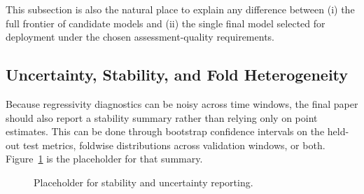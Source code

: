 \documentclass[12pt]{article}
\theoremstyle{plain}
\theoremstyle{definition}
\begin{document}
\begin{table}[t]
\centering
\caption{Placeholder for the exact empirical calibration rule used on validation folds.}
\label{tab:calibration_constraints_placeholder}
\end{table}

\begin{table}[t]
\centering
\caption{Placeholder for the final selected configuration under constrained calibration.}
\label{tab:selected_model_placeholder}
\end{table}

This subsection is also the natural place to explain any difference between (i) the full frontier of candidate models and (ii) the single final model selected for deployment under the chosen assessment-quality requirements.

\subsection{Uncertainty, Stability, and Fold Heterogeneity}

Because regressivity diagnostics can be noisy across time windows, the final paper should also report a stability summary rather than relying only on point estimates. This can be done through bootstrap confidence intervals on the held-out test metrics, foldwise distributions across validation windows, or both. Figure~\ref{fig:stability_placeholder} is the placeholder for that summary.

\begin{figure}[t]
\centering
{}
\caption{Placeholder for stability and uncertainty reporting.}
\label{fig:stability_placeholder}
\end{figure}
\end{document}
